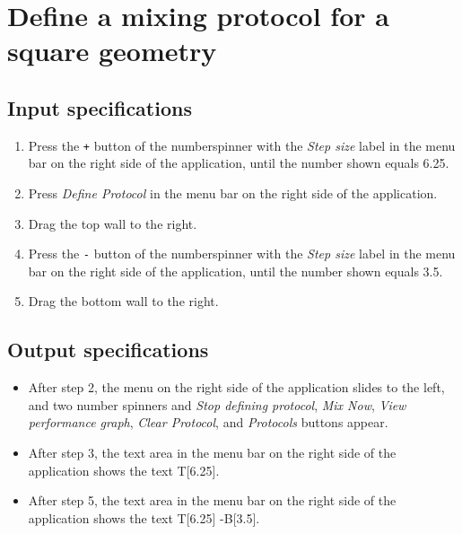 \section{Define a mixing protocol for a square geometry}

\subsection*{Input specifications}
\begin{enumerate}
\item Press the \texttt{+} button of the numberspinner with the \emph{Step size} label in the menu bar on the right side of the application, until the number shown equals 6.25.
\item Press \emph{Define Protocol} in the menu bar on the right side of the application.
\item Drag the top wall to the right.
\item Press the \texttt{-} button of the numberspinner with the \emph{Step size} label in the menu bar on the right side of the application, until the number shown equals 3.5.
\item Drag the bottom wall to the right.
\end{enumerate}

\subsection*{Output specifications}
\begin{itemize}
\item After step 2, the menu on the right side of the application slides to the left, and two number spinners and \emph{Stop defining protocol}, \emph{Mix Now}, \emph{View performance graph}, \emph{Clear Protocol}, and \emph{Protocols} buttons appear.
\item After step 3, the text area in the menu bar on the right side of the application shows the text T[6.25].
\item After step 5, the text area in the menu bar on the right side of the application shows the text T[6.25] -B[3.5].
\end{itemize}